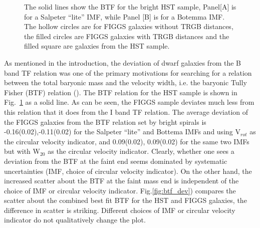 \documentclass[useAMS,usenatbib]{mn2e}
\begin{document}
%

\begin{figure}
\caption{The solid lines show the BTF for the bright HST sample,
Panel[A] is for a Salpeter ``lite'' IMF, while Panel [B] is for a Botemma IMF. The hollow circles are for FIGGS galaxies without TRGB distances, the filled circles are FIGGS galaxies with TRGB distances and the filled square are galaxies from the HST sample. }
\label{fig:btf}
\end{figure}

As mentioned in the introduction, the deviation of dwarf galaxies
from the B band TF relation was one of the primary motivations for searching for a relation between the total baryonic mass and the
velocity width, i.e. the baryonic Tully Fisher (BTF) relation 
(\cite{mg00}). The BTF relation for the HST sample is shown in
Fig.~\ref{fig:btf} as a solid line. As can be seen, the FIGGS sample deviates much less from this relation that it does from the I band TF relation. The average deviation of the FIGGS galaxies from the BTF relation set by bright spirals is -0.16(0.02),-0.11(0.02) for the Salpeter ``lite'' and Bottema IMFs and using V$_{rot}$ as the circular velocity indicator, and 0.09(0.02), 0.09(0.02) for the same two IMFs but with W$_{20}$ as the circular velocity indicator. Clearly, whether one sees a deviation from the BTF at the faint end seems dominated by  systematic uncertainties (IMF, choice of circular velocity indicator). On the other hand, the increased scatter about the BTF at the faint mass end is independent of the choice of IMF or circular velocity indicator.  Fig.\ref{fig:btf_dev}) compares the scatter about the combined best fit BTF for the HST and FIGGS galaxies, the difference
in scatter is striking. Different choices of IMF or circular velocity indicator do not qualitatively change the plot.
\end{document}
